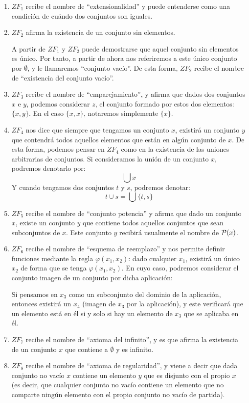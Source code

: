 \begin{enumerate}
    \item $ZF_1$ recibe el nombre de ``extensionalidad'' y puede entenderse como una condición de cuándo dos conjuntos son iguales.
    \item $ZF_2$ afirma la existencia de un conjunto sin elementos.

        A partir de $ZF_1$ y $ZF_2$ puede demostrarse que aquel conjunto sin elementos es único. Por tanto, a partir de ahora nos referiremos a este único conjunto por $\emptyset $, y le llamaremos ``conjunto vacío''. De esta forma, $ZF_2$ recibe el nombre de ``existencia del conjunto vacío''.
    \item $ZF_3$ recibe el nombre de ``emparejamiento'', y afirma que dados dos conjuntos $x$ e $y$, podemos considerar $z$, el conjunto formado por estos dos elementos: $\{x,y\}$. En el caso $\{x,x\}$, notaremos simplemente $\{x\}$.
    \item $ZF_4$ nos dice que siempre que tengamos un conjunto $x$, existirá un conjunto $y$ que contendrá todos aquellos elementos que están en algún conjunto de $x$. De esta forma, podemos pensar en $ZF_4$ como en la existencia de las uniones arbitrarias de conjuntos. 
        Si consideramos la unión de un conjunto $x$, podremos denotarlo por:
        \begin{equation*}
            \bigcup x
        \end{equation*}
        Y cuando tengamos dos conjuntos $t$ y $s$, podremos denotar:
        \begin{equation*}
            t\cup s = \bigcup \{t,s\}
        \end{equation*}
    \item $ZF_5$ recibe el nombre de ``conjunto potencia'' y afirma que dado un conjunto $x$, existe un conjunto $y$ que contiene todos aquellos conjuntos que sean subconjuntos de $x$. Este conjunto $y$ recibirá usualmente el nombre de $\mathcal{P}(x)$.
    \item $ZF_6$ recibe el nombre de ``esquema de reemplazo'' y nos permite definir funciones mediante la regla $\varphi(x_1,x_2)$: dado cualquier $x_1$, existirá un único $x_2$ de forma que se tenga $\varphi(x_1,x_2)$. En cuyo caso, podremos considerar el conjunto imagen de un conjunto por dicha aplicación:

        Si pensamos en $x_3$ como un subconjunto del dominio de la aplicación, entonces existirá un $x_4$ (imagen de $x_3$ por la aplicación), y este verificará que un elemento está en él si y solo si hay un elemento de $x_3$ que se aplicaba en él.
    \item $ZF_7$ recibe el nombre de ``axioma del infinito'', y es que afirma la existencia de un conjunto $x$ que contiene a $\emptyset $ y es infinito.
    \item $ZF_8$ recibe el nombre de ``axioma de regularidad'', y viene a decir que dada conjunto no vacío $x$ contiene un elemento $y$ que es disjunto con el propio $x$ (es decir, que cualquier conjunto no vacío contiene un elemento que no comparte ningún elemento con el propio conjunto no vacío de partida).


\end{enumerate}
